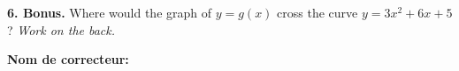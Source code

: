 \documentclass[8pt]{exam}
\begin{document}
\begin{questions}
\begin{minipage}{0.5\textwidth}
\end{minipage}

\vfill

\textbf{6. Bonus.} Where would the graph of $y=g(x)$ cross the curve $y = 3x^2 + 6x + 5$ ? \hfill \emph{Work on the back.}

\end{questions}

\begin{tcolorbox}

\textbf{Nom de correcteur:}

\begin{center}
\gradetable[h][questions]
\end{center}

\end{tcolorbox}
\end{document}
